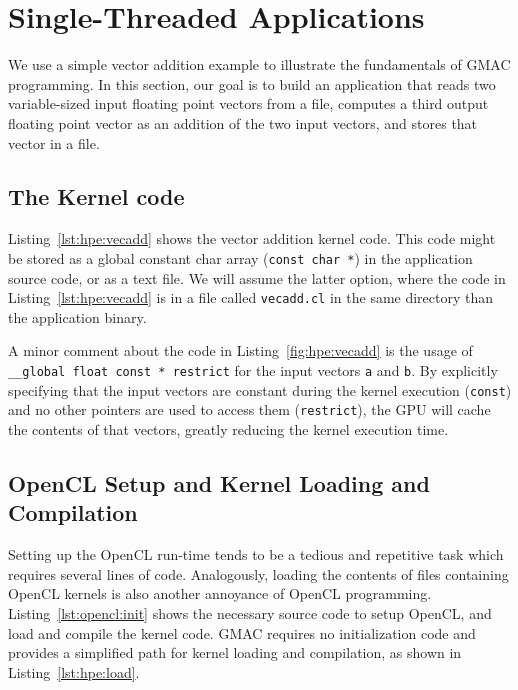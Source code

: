 \section{Single\hyp{}Threaded Applications}

We use a simple vector addition example to illustrate the fundamentals of GMAC programming. In this 
section, our goal is to build an application that reads two variable\hyp{}sized input floating point 
vectors from a file, computes a third output floating point vector as an addition of the two input 
vectors, and stores that vector in a file.

\subsection{The Kernel code}
Listing~\ref{lst:hpe:vecadd} shows the vector addition kernel code. This code might be stored as a 
global constant char array (\ie \texttt{const char *}) in the application source code, or as a text 
file. We will assume the latter option, where the code in Listing~\ref{lst:hpe:vecadd} is in a file 
called \texttt{vecadd.cl} in the same directory than the application binary.



A minor comment about the code in Listing~\ref{fig:hpe:vecadd} is the usage of \texttt{\_\_global 
float const * restrict} for the input  vectors \texttt{a} and \texttt{b}. By explicitly specifying 
that the input vectors are constant during the kernel execution (\ie \texttt{const}) and no other 
pointers are used to access them (\ie \texttt{restrict}), the GPU will cache the contents of that 
vectors, greatly reducing the kernel execution time.

\subsection{OpenCL Setup and Kernel Loading and Compilation}
Setting up the OpenCL run\hyp{}time tends to be a tedious and repetitive task which requires several 
lines of code. Analogously, loading the contents of files containing OpenCL kernels is also another 
annoyance of OpenCL programming. Listing~\ref{lst:opencl:init} shows the necessary source code to 
setup OpenCL, and load and compile the kernel code. GMAC requires no initialization code and 
provides a simplified path for kernel loading and compilation, as shown in 
Listing~\ref{lst:hpe:load}.


